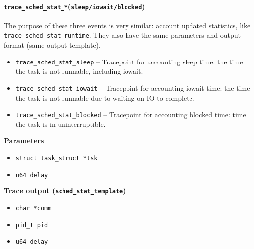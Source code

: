 \paragraph{\texttt{trace\_sched\_stat\_*}(\texttt{sleep/iowait/blocked})} 
The purpose of these three events is very similar: account updated statistics, like \texttt{trace\_sched\_stat\_runtime}.
They also have the same parameters and output format (same output template).
\begin{itemize}
    \item \texttt{trace\_sched\_stat\_sleep} -- Tracepoint for accounting sleep time: the time the task is not runnable, including iowait.
    \item \texttt{trace\_sched\_stat\_iowait} -- Tracepoint for accounting iowait time: the time the task is not runnable due to waiting on IO to complete.
    \item \texttt{trace\_sched\_stat\_blocked} -- Tracepoint for accounting blocked time: time the task is in uninterruptible.
\end{itemize}

\textbf{Parameters}
\begin{itemize}
    \item \verb|struct task_struct *tsk|
    \item \verb|u64 delay|
\end{itemize}

\textbf{Trace output (\texttt{sched\_stat\_template})}
\begin{itemize}
    \item \verb|char *comm|
    \item \verb|pid_t pid|
    \item \verb|u64 delay|
\end{itemize}

